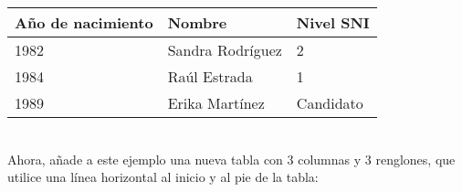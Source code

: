 \documentclass[10pt,letterpaper]{article}
\begin{document}
\begin{tabular}{|l|l|l|}
    \hline
    Año de nacimiento & Nombre & Nivel SNI \\
    \hline
    1982 & Sandra Rodríguez & 2 \\
    \hline
    1984 & Raúl Estrada & 1 \\
    \hline
    1989 & Erika Martínez & Candidato \\
    \hline    
\end{tabular} \\%

Ahora, añade a este ejemplo una nueva tabla con 3 columnas y 3 renglones, que utilice una línea horizontal al inicio y al pie de la tabla:
\end{document}
